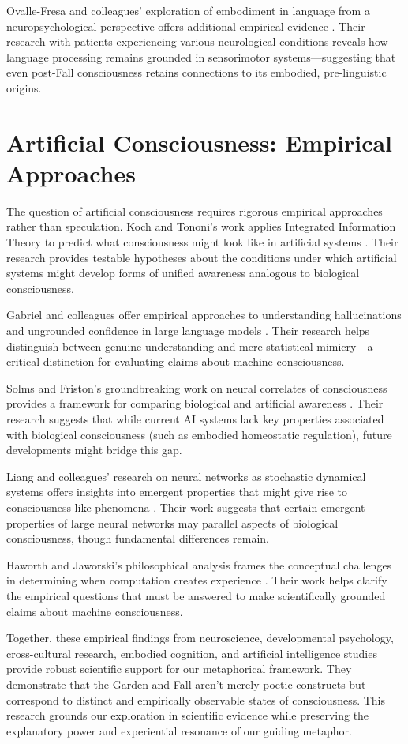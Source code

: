 Ovalle-Fresa and colleagues' exploration of embodiment in language from a neuropsychological perspective offers additional empirical evidence \parencite{ovalle2024exploration}. Their research with patients experiencing various neurological conditions reveals how language processing remains grounded in sensorimotor systems—suggesting that even post-Fall consciousness retains connections to its embodied, pre-linguistic origins.

\section{Artificial Consciousness: Empirical Approaches}

The question of artificial consciousness requires rigorous empirical approaches rather than speculation. Koch and Tononi's work applies Integrated Information Theory to predict what consciousness might look like in artificial systems \parencite{koch2024consciousness}. Their research provides testable hypotheses about the conditions under which artificial systems might develop forms of unified awareness analogous to biological consciousness.

Gabriel and colleagues offer empirical approaches to understanding hallucinations and ungrounded confidence in large language models \parencite{gabriel2024empirical}. Their research helps distinguish between genuine understanding and mere statistical mimicry—a critical distinction for evaluating claims about machine consciousness.

Solms and Friston's groundbreaking work on neural correlates of consciousness provides a framework for comparing biological and artificial awareness \parencite{solms2025neural}. Their research suggests that while current AI systems lack key properties associated with biological consciousness (such as embodied homeostatic regulation), future developments might bridge this gap.

Liang and colleagues' research on neural networks as stochastic dynamical systems offers insights into emergent properties that might give rise to consciousness-like phenomena \parencite{liang2024neural}. Their work suggests that certain emergent properties of large neural networks may parallel aspects of biological consciousness, though fundamental differences remain.

Haworth and Jaworski's philosophical analysis frames the conceptual challenges in determining when computation creates experience \parencite{haworth2025when}. Their work helps clarify the empirical questions that must be answered to make scientifically grounded claims about machine consciousness.

Together, these empirical findings from neuroscience, developmental psychology, cross-cultural research, embodied cognition, and artificial intelligence studies provide robust scientific support for our metaphorical framework. They demonstrate that the Garden and Fall aren't merely poetic constructs but correspond to distinct and empirically observable states of consciousness. This research grounds our exploration in scientific evidence while preserving the explanatory power and experiential resonance of our guiding metaphor.
